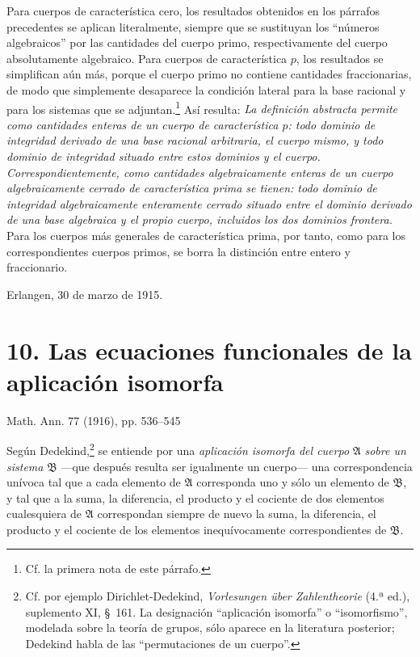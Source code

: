 \documentclass[11pt]{article}
\begin{document}
Para cuerpos de característica cero, los resultados obtenidos en los párrafos precedentes se aplican literalmente, siempre que se sustituyan los ``números algebraicos'' por las cantidades del cuerpo primo, respectivamente del cuerpo absolutamente algebraico. Para cuerpos de característica $p$, los resultados se simplifican aún más, porque el cuerpo primo no contiene cantidades fraccionarias, de modo que simplemente desaparece la condición lateral para la base racional y para los sistemas que se adjuntan.\footnote{Cf. la primera nota de este párrafo.} Así resulta: \emph{La definición abstracta permite como cantidades enteras de un cuerpo de característica $p$: todo dominio de integridad derivado de una base racional arbitraria, el cuerpo mismo, y todo dominio de integridad situado entre estos dominios y el cuerpo. Correspondientemente, como cantidades algebraicamente enteras de un cuerpo algebraicamente cerrado de característica prima se tienen: todo dominio de integridad algebraicamente enteramente cerrado situado entre el dominio derivado de una base algebraica y el propio cuerpo, incluidos los dos dominios frontera.} Para los cuerpos más generales de característica prima, por tanto, como para los correspondientes cuerpos primos, se borra la distinción entre entero y fraccionario.

\medskip
\noindent Erlangen, 30 de marzo de 1915.

\clearpage
\section*{10. Las ecuaciones funcionales de la aplicación isomorfa}
\begin{center}
Math. Ann. 77 (1916), pp. 536--545
\end{center}

Según Dedekind,\footnote{Cf. por ejemplo Dirichlet-Dedekind, \emph{Vorlesungen über Zahlentheorie} (4.ª ed.), suplemento XI, \S\ 161. La designación ``aplicación isomorfa'' o ``isomorfismo'', modelada sobre la teoría de grupos, sólo aparece en la literatura posterior; Dedekind habla de las ``permutaciones de un cuerpo''.} se entiende por una \emph{aplicación isomorfa del cuerpo} $\mathfrak A$ \emph{sobre un sistema} $\mathfrak B$ ---que después resulta ser igualmente un cuerpo--- una correspondencia unívoca tal que a cada elemento de $\mathfrak A$ corresponda uno y sólo un elemento de $\mathfrak B$, y tal que a la suma, la diferencia, el producto y el cociente de dos elementos cualesquiera de $\mathfrak A$ correspondan siempre de nuevo la suma, la diferencia, el producto y el cociente de los elementos inequívocamente correspondientes de $\mathfrak B$.
\end{document}
